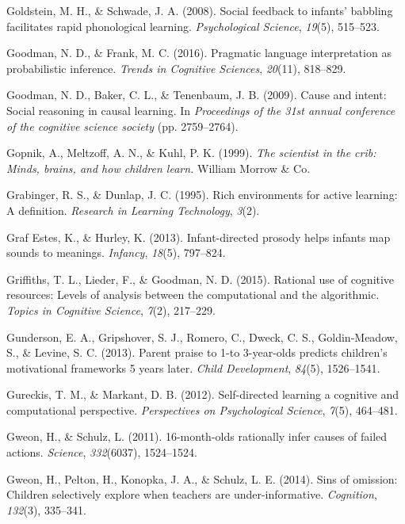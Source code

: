 \documentclass[oneside]{report}
\begin{document}
\hypertarget{ref-goldstein2008social}{}
Goldstein, M. H., \& Schwade, J. A. (2008). Social feedback to infants'
babbling facilitates rapid phonological learning. \emph{Psychological
Science}, \emph{19}(5), 515--523.

\hypertarget{ref-goodman2016pragmatic}{}
Goodman, N. D., \& Frank, M. C. (2016). Pragmatic language
interpretation as probabilistic inference. \emph{Trends in Cognitive
Sciences}, \emph{20}(11), 818--829.

\hypertarget{ref-goodman2009cause}{}
Goodman, N. D., Baker, C. L., \& Tenenbaum, J. B. (2009). Cause and
intent: Social reasoning in causal learning. In \emph{Proceedings of the
31st annual conference of the cognitive science society} (pp.
2759--2764).

\hypertarget{ref-gopnik1999scientist}{}
Gopnik, A., Meltzoff, A. N., \& Kuhl, P. K. (1999). \emph{The scientist
in the crib: Minds, brains, and how children learn.} William Morrow \&
Co.

\hypertarget{ref-grabinger1995rich}{}
Grabinger, R. S., \& Dunlap, J. C. (1995). Rich environments for active
learning: A definition. \emph{Research in Learning Technology},
\emph{3}(2).

\hypertarget{ref-graf2013infant}{}
Graf Estes, K., \& Hurley, K. (2013). Infant-directed prosody helps
infants map sounds to meanings. \emph{Infancy}, \emph{18}(5), 797--824.

\hypertarget{ref-griffiths2015rational}{}
Griffiths, T. L., Lieder, F., \& Goodman, N. D. (2015). Rational use of
cognitive resources: Levels of analysis between the computational and
the algorithmic. \emph{Topics in Cognitive Science}, \emph{7}(2),
217--229.

\hypertarget{ref-gunderson2013parent}{}
Gunderson, E. A., Gripshover, S. J., Romero, C., Dweck, C. S.,
Goldin-Meadow, S., \& Levine, S. C. (2013). Parent praise to 1-to
3-year-olds predicts children's motivational frameworks 5 years later.
\emph{Child Development}, \emph{84}(5), 1526--1541.

\hypertarget{ref-gureckis2012self}{}
Gureckis, T. M., \& Markant, D. B. (2012). Self-directed learning a
cognitive and computational perspective. \emph{Perspectives on
Psychological Science}, \emph{7}(5), 464--481.

\hypertarget{ref-gweon201116}{}
Gweon, H., \& Schulz, L. (2011). 16-month-olds rationally infer causes
of failed actions. \emph{Science}, \emph{332}(6037), 1524--1524.

\hypertarget{ref-gweon2014sins}{}
Gweon, H., Pelton, H., Konopka, J. A., \& Schulz, L. E. (2014). Sins of
omission: Children selectively explore when teachers are
under-informative. \emph{Cognition}, \emph{132}(3), 335--341.
\end{document}

